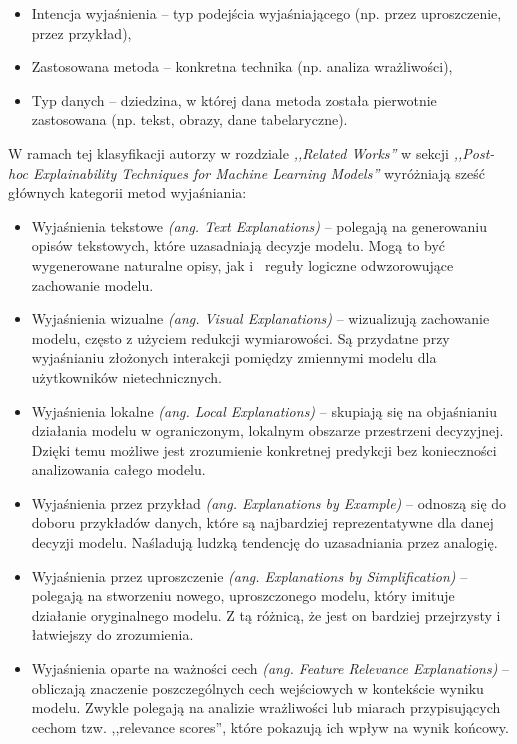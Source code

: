 \documentclass[wmii, inf, mgr]{uwmthesis}
\begin{document}
\begin{itemize}
    \item {Intencja wyjaśnienia} -- typ podejścia wyjaśniającego (np. przez uproszczenie, przez przykład),
    \item {Zastosowana metoda} -- konkretna technika (np. analiza wrażliwości),
    \item {Typ danych} -- dziedzina, w której dana metoda została pierwotnie zastosowana (np. tekst, obrazy, dane tabelaryczne).
\end{itemize}

W ramach tej klasyfikacji autorzy w rozdziale \textit{,,Related Works''} w sekcji \textit{,,Post-hoc Explainability Techniques for Machine Learning Models''} \cite{XAI} wyróżniają sześć głównych kategorii metod wyjaśniania:

\begin{itemize}
    \item {Wyjaśnienia tekstowe \textit{(ang. Text Explanations)}} -- polegają na generowaniu opisów tekstowych, które uzasadniają decyzje modelu. Mogą to być wygenerowane naturalne opisy, jak i~ reguły logiczne odwzorowujące zachowanie modelu.
    
    \item {Wyjaśnienia wizualne \textit{(ang. Visual Explanations)}} -- wizualizują zachowanie modelu, często z użyciem redukcji wymiarowości. Są przydatne przy wyjaśnianiu złożonych interakcji pomiędzy zmiennymi modelu dla użytkowników nietechnicznych.
    
    \item {Wyjaśnienia lokalne \textit{(ang. Local Explanations)}} -- skupiają się na objaśnianiu działania modelu w ograniczonym, lokalnym obszarze przestrzeni decyzyjnej. Dzięki temu możliwe jest zrozumienie konkretnej predykcji bez konieczności analizowania całego modelu.
    
    \item {Wyjaśnienia przez przykład \textit{(ang. Explanations by Example)}} -- odnoszą się do doboru przykładów danych, które są najbardziej reprezentatywne dla danej decyzji modelu. Naśladują ludzką tendencję do uzasadniania przez analogię.
    
    \item {Wyjaśnienia przez uproszczenie \textit{(ang. Explanations by Simplification)}} -- polegają na stworzeniu nowego, uproszczonego modelu, który imituje działanie oryginalnego modelu. Z tą różnicą, że jest on bardziej przejrzysty i łatwiejszy do zrozumienia.
    
    \item {Wyjaśnienia oparte na ważności cech \textit{(ang. Feature Relevance Explanations)}} --  obliczają znaczenie poszczególnych cech wejściowych w kontekście wyniku modelu. Zwykle polegają na analizie wrażliwości lub miarach przypisujących cechom tzw. ,,relevance scores'', które pokazują ich wpływ na wynik końcowy.
\end{itemize}
\end{document}
